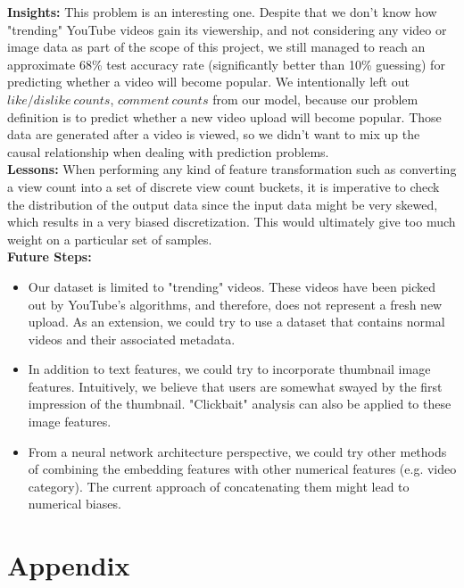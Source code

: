 \documentclass[english]{article}
\begin{document}
\textbf{Insights:} This problem is an interesting one. Despite that we don't know how "trending" YouTube videos gain its viewership, and not considering any video or image data as part of the scope of this project, we still managed to reach an approximate 68\% test accuracy rate (significantly better than 10\% guessing) for predicting whether a video will become popular. We intentionally left out $like/dislike\ counts$, $comment\ counts$ from our model, because our problem definition is to predict whether a new video upload will become popular. Those data are generated after a video is viewed, so we didn't want to mix up the causal relationship when dealing with prediction problems.\\

\textbf{Lessons:} When performing any kind of feature transformation such as converting a view count into a set of discrete view count buckets, it is imperative to check the distribution of the output data since the input data might be very skewed, which results in a very biased discretization. This would ultimately give too much weight on a particular set of samples. \\

\textbf{Future Steps:} 
\begin{itemize}
    \item Our dataset is limited to "trending" videos. These videos have been picked out by YouTube's algorithms, and therefore, does not represent a fresh new upload. As an extension, we could try to use a dataset that contains normal videos and their associated metadata. 
    \item In addition to text features, we could try to incorporate thumbnail image features. Intuitively, we believe that users are somewhat swayed by the first impression of the thumbnail. "Clickbait" analysis can also be applied to these image features.
    \item From a neural network architecture perspective, we could try other methods of combining the embedding features with other numerical features (e.g. video category). The current approach of concatenating them might lead to numerical biases.
\end{itemize}

\pagebreak
\section*{Appendix}
\end{document}
